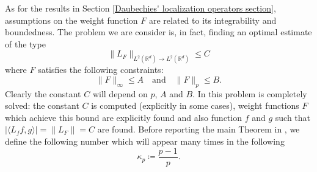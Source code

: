 \documentclass[corpo=11pt, stile=classica, tipotesi=custom,
greek, evenboxes, english]{toptesi}
\numberwithin{equation}{chapter}
\theoremstyle{remark}
\newcommand{\R}{\mathbb{R}} %
\begin{document}
As for the results in Section \ref{Daubechies' localization operators section}, assumptions on the weight function $F$ are related to its integrability and boundedness. The problem we are consider is, in fact, finding an optimal estimate of the type
\begin{equation}\label{sharp estimate Nicola-Tilli}
	\|L_F\|_{L^2(\R^d) \rightarrow L^2(\R^d)} \leq C
\end{equation}
where $F$ satisfies the following constraints:
\begin{equation}\label{constraints Nicola-Tilli}
	\|F\|_{\infty} \leq A \quad \text{and} \quad \|F\|_p \leq B.
\end{equation}
Clearly the constant $C$ will depend on $p$, $A$ and $B$. In \cite{nicolatilli_norm} this problem is completely solved: the constant $C$ is computed (explicitly in some cases), weight functions $F$ which achieve this bound are explicitly found and also function $f$ and $g$ such that $|\langle L_f f, g \rangle| = \|L_F\| = C$ are found. Before reporting the main Theorem in \cite{nicolatilli_norm}, we define the following number which will appear many times in the following
\begin{equation}\label{kappa_p}
	\kappa_p \coloneqq \dfrac{p-1}{p}.
\end{equation}
\end{document}
